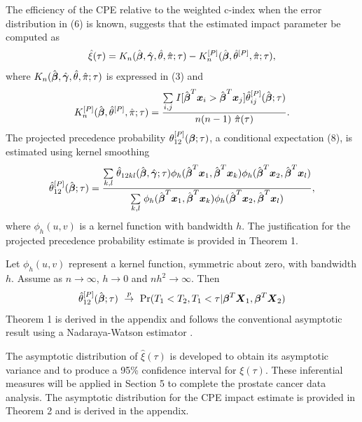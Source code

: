 \documentclass[12pt]{article}
\newcommand{\bmx}{\mbox{\boldmath $x$}}
\newcommand{\bmX}{\mbox{\boldmath $X$}}
\newcommand{\bg}{\mbox{\boldmath $\gamma$}}
\newcommand{\bb}{\mbox{\boldmath $\beta$}}
\def\stackunder#1#2{\mathrel{\mathop{#2}\limits_{#1}}}
\begin{document}
The efficiency of the CPE relative to the weighted c-index when the error distribution in (6) is known, suggests that 
the estimated impact parameter be computed as 
\[ \hat{\xi}(\tau) = K_n(\hat{\bb}, \hat{\bg}, \hat{\theta},\hat{\pi} ; \tau) - K_n^{[P]}(\hat{\bb}, \hat{\theta}^{[P]},\hat{\pi} ; \tau) ,\]
 where $K_n(\hat{\bb}, \hat{\bg},\hat{\theta},\hat{\pi} ; \tau)$ is expressed in (3) and  
\[ K_n^{[P]}(\hat{\bb}, \hat{\theta}^{[P]},\hat{\pi}; \tau) = \frac{\stackunder{i, j}{\sum} I[\hat{\bb}^T\bmx_{i}  > \hat{\bb}^T\bmx_{j}]  \hat{\theta}_{ij}^{[P]}(\hat{\bb}; \tau)}{n(n-1) \ \hat{\pi}(\tau)} .\]
The projected precedence probability $\theta_{12}^{[P]}(\bb;\tau)$, a conditional expectation (8), is estimated using kernel smoothing
\[ \hat{\theta}_{12}^{[P]}(\hat{\bb}; \tau) = \frac{ \stackunder{k,l}{\sum} \hat{\theta}_{12kl}(\hat{\bb}, \hat{\bg};\tau) \phi_h(\hat{\bb}^T\bmx_1,\hat{\bb}^T\bmx_k) \phi_h(\hat{\bb}^T\bmx_2,\hat{\bb}^T\bmx_l)}
 {\stackunder{k,l}{\sum} \phi_h(\hat{\bb}^T\bmx_1,\hat{\bb}^T\bmx_k) \phi_h(\hat{\bb}^T\bmx_2,\hat{\bb}^T\bmx_l)}  ,\]
where $\phi_h(u,v)$ is a kernel function with bandwidth $h$. The justification for the projected precedence probability estimate is provided in Theorem 1.
 
\vskip 0.30in

\newline Let $\phi_h(u,v)$ represent a kernel function, symmetric about zero, with bandwidth $h$. Assume as $n \rightarrow \infty$, $h \rightarrow 0$ and $nh^2 \rightarrow \infty$. Then
 \[ \hat{\theta}_{12}^{[P]}(\hat{\bb}; \tau) \ \stackrel{p}{\rightarrow} \  \mbox{Pr}(T_1 < T_2, T_1 < \tau| \bb^T\bmX_1, \bb^T\bmX_2)  \] 
Theorem 1  is derived in the appendix and follows the conventional asymptotic result using a Nadaraya-Watson estimator \citep{Simonoff1996}. 

The asymptotic distribution of $\hat{\xi}(\tau)$ is developed to obtain its asymptotic variance and to produce a 95\% confidence interval for $\xi(\tau)$. These inferential measures will be applied in Section 5 to complete the prostate cancer data analysis. The asymptotic distribution for the CPE impact estimate is provided in Theorem 2 and is derived in the appendix. 


\vskip 0.35in
\end{document}
